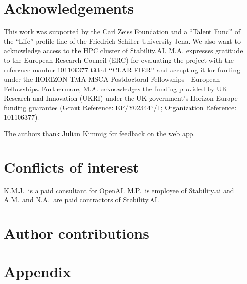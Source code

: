 \documentclass[11pt, oneside]{article}
\begin{document}
\section*{Acknowledgements}
This work was supported by the Carl Zeiss Foundation and a \enquote{Talent Fund} of the \enquote{Life} profile line of the Friedrich Schiller University Jena.
We also want to acknowledge access to the HPC cluster of Stability.AI.
M.A. expresses gratitude to the European Research Council (ERC) for evaluating the project with the reference number 101106377 titled ‘‘CLARIFIER’’ and accepting it for funding under the HORIZON TMA MSCA Postdoctoral Fellowships - European Fellowships. 
Furthermore, M.A. acknowledges the funding provided by UK Research and Innovation (UKRI) under the UK government’s Horizon Europe funding guarantee (Grant Reference: EP/Y023447/1; Organization Reference: 101106377).

The authors thank Julian Kimmig for feedback on the web app. 

\section*{Conflicts of interest}
K.M.J.\ is a paid consultant for OpenAI. M.P.\ is employee of Stability.ai and A.M.\ and N.A.\ are paid contractors of Stability.AI.

\section*{Author contributions}

\footnotesize
\insertcredits
\normalsize



\appendix
\section{Appendix}



\end{document}
